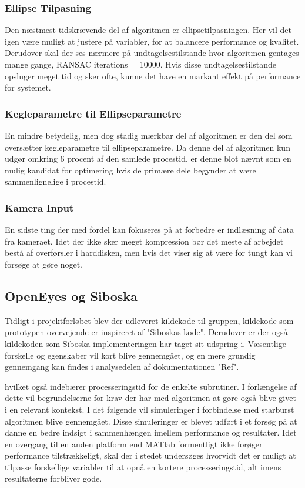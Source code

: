 \documentclass[rapport.tex]{subfiles}
\begin{document}
	\subsubsection{Ellipse Tilpasning}
	Den næstmest tidskrævende del af algoritmen er ellipsetilpasningen. Her vil det igen være muligt at justere på variabler, for at balancere performance og kvalitet. Derudover skal der ses nærmere på undtagelsestilstande hvor algoritmen gentages mange gange, RANSAC iterations = 10000. Hvis disse undtagelsestilstande opsluger meget tid og sker ofte, kunne det have en markant effekt på performance for systemet.
	
	\subsubsection{Kegleparametre til Ellipseparametre}
	En mindre betydelig, men dog stadig mærkbar del af algoritmen er den del som oversætter kegleparametre til ellipseparametre. Da denne del af algoritmen kun udgør omkring 6 procent af den samlede procestid, er denne blot nævnt som en mulig kandidat for optimering hvis de primære dele begynder at være sammenlignelige i procestid. 
	
	\subsubsection{Kamera Input}
	En sidste ting der med fordel kan fokuseres på at forbedre er indlæsning af data fra kameraet. Idet der ikke sker meget kompression bør det meste af arbejdet bestå af overførsler i harddisken, men hvis det viser sig at være for tungt kan vi forsøge at gøre noget.
	\subsection{OpenEyes og Siboska}
	Tidligt i projektforløbet blev der udleveret kildekode til gruppen, kildekode som prototypen overvejende er inspireret af "Siboskas kode". Derudover er der også kildekoden som Siboska implementeringen har taget sit
	udspring i. Væsentlige forskelle og egenskaber vil kort blive gennemgået, og en mere grundig gennemgang kan findes i analysedelen af dokumentationen "Ref".
	
	 hvilket også indebærer processeringstid for de enkelte subrutiner. I forlængelse af dette vil begrundelserne for krav der har med algoritmen at gøre også blive givet i en relevant kontekst.
	I det følgende vil simuleringer i forbindelse med starburst algoritmen blive gennemgået. Disse simuleringer er blevet udført i et forsøg på at danne en bedre indsigt i sammenhængen imellem performance og resultater. Idet en overgang til en anden platform end MATlab formentligt ikke forøger performance tilstrækkeligt, skal der i stedet undersøges hvorvidt det er muligt at tilpasse forskellige variabler til at opnå en kortere processeringstid, alt imens resultaterne forbliver gode.
	
\end{document}
